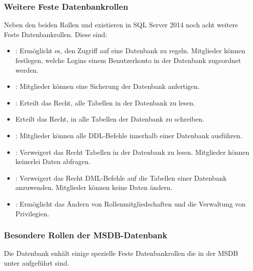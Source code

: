         \subsubsection{Weitere Feste Datenbankrollen}
          Neben den beiden Rollen  und 
          existieren in SQL Server 2014 noch acht weitere Feste Datenbankrollen.
          Diese sind:
          \begin{itemize}
            \item {}: Ermöglicht es, den Zugriff auf
            eine Datenbank zu regeln. Mitglieder können festlegen, welche Logins
            einem Benutzerkonto in der Datenbank zugeordnet werden.
            \item {}: Mitglieder können eine
            Sicherung der Datenbank anfertigen.
            \item {}: Erteilt das Recht, alle Tabellen in
            der Datenbank zu lesen.
            \item {} Erteilt das Recht, in alle
            Tabellen der Datenbank zu schreiben.
            \item {}: Mitglieder können alle DDL-Befehle
            innerhalb einer Datenbank ausführen.
            \item {}: Verweigert das Recht Tabellen
            in der Datenbank zu lesen. Mitglieder können keinerlei Daten
            abfragen.
            \item {}: Verweigert das Recht
            DML-Befehle auf die Tabellen einer Datenbank anzuwenden. Mitglieder
            können keine Daten ändern.
            \item {}: Ermöglicht das Ändern von
            Rollenmitgliedschaften und die Verwaltung von Privilegien.
          \end{itemize}
          \begin{literaturinternet}
            \item \cite{ms189121}
            \item \cite{ms189612}
          \end{literaturinternet}
        \subsubsection{Besondere Rollen der MSDB-Datenbank}
          Die Datenbank  enhält einige spezielle Feste
          Datenbankrollen die in der MSDB unter \parencite{ms189121} aufgeführt
          sind.
